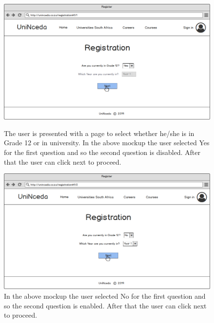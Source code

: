 \documentclass[a4paper, 12pt]{article}
\begin{document}
\renewcommand{\figurename}{Step}

\setcounter{figure}{0}

\begin{figure}[H]
\centering
\includegraphics[scale=0.45]{Registration(1)IfYes}
\caption{The user is presented with a page to select whether he/she is in Grade 12 or in university. In the above mockup the user selected Yes for the first question and so the second question is disabled. After that the user can click next to proceed.}
\label{Registration(1)IfYes}

\vspace{1cm}
\setcounter{figure}{0}

\includegraphics[scale=0.45]{Registration(1)IfNo}
\caption{ In the above mockup the user selected No for the first question and so the second question is enabled. After that the user can click next to proceed.}
\label{Registration(1)IfNo}
\end{figure}
\end{document}
